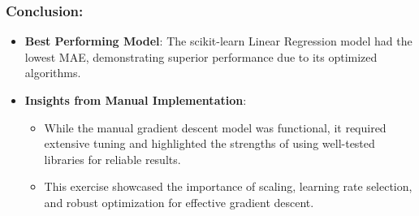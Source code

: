 \documentclass[11pt]{article}
\providecommand{\tightlist}{%
      \setlength{\itemsep}{0pt}\setlength{\parskip}{0pt}}
\begin{document}
\subsubsection{Conclusion:}\label{conclusion}

\begin{itemize}
\tightlist
\item
  \textbf{Best Performing Model}: The scikit-learn Linear Regression
  model had the lowest MAE, demonstrating superior performance due to
  its optimized algorithms.
\item
  \textbf{Insights from Manual Implementation}:

  \begin{itemize}
  \tightlist
  \item
    While the manual gradient descent model was functional, it required
    extensive tuning and highlighted the strengths of using well-tested
    libraries for reliable results.
  \item
    This exercise showcased the importance of scaling, learning rate
    selection, and robust optimization for effective gradient descent.
  \end{itemize}
\end{itemize}


    
    
    
\end{document}
